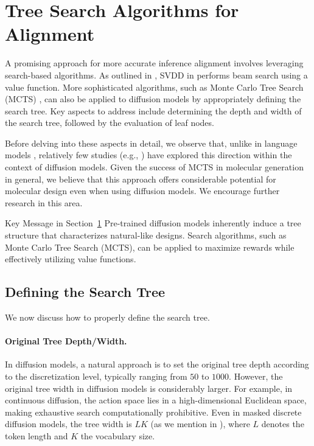 \section{Tree Search Algorithms for Alignment}\label{sec:MCTS}

A promising approach for more accurate inference alignment involves leveraging search-based algorithms. As outlined in , SVDD in \citet{li2024derivative} performs beam search using a value function. More sophisticated algorithms, such as Monte Carlo Tree Search (MCTS) \citep{kocsis2006bandit,silver2016mastering,hubert2021learning,xiao2019maximum}, can also be applied to diffusion models by appropriately defining the search tree. Key aspects to address include determining the depth and width of the search tree, followed by the evaluation of leaf nodes.

Before delving into these aspects in detail, we observe that, unlike in language models \citep{feng2023alphazero,hao2023reasoning}, relatively few studies (e.g., \citet{li2024derivative}) have explored this direction within the context of diffusion models. Given the success of MCTS in molecular generation \citep{yang2017chemts,kajita2020autonomous,yang2020practical,swanson2024generative} in general, we believe that this approach offers considerable potential for molecular design even when using diffusion models. We encourage further research in this area.

\begin{AIbox}{Key Message in Section~\ref{sec:MCTS}} 
Pre-trained diffusion models inherently induce a tree structure that characterizes natural-like designs. Search algorithms, such as Monte Carlo Tree Search (MCTS), can be applied to maximize rewards while effectively utilizing value functions.
\end{AIbox}


\subsection{Defining the Search Tree}

We now discuss how to properly define the search tree.

\paragraph{Original Tree Depth/Width.}
In diffusion models, a natural approach is to set the original tree depth according to the discretization level, typically ranging from $50$ to $1000$. However, the original tree width in diffusion models is considerably larger. For example, in continuous diffusion, the action space lies in a high-dimensional Euclidean space, making exhaustive search computationally prohibitive. Even in masked discrete diffusion models, the tree width is $LK$ (as we mention in ), where $L$ denotes the token length and $K$ the vocabulary size. 



